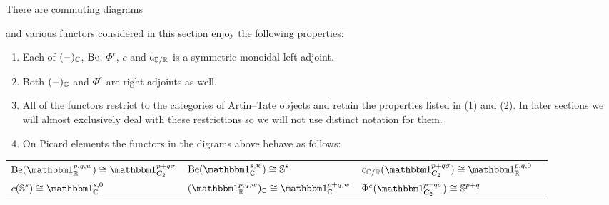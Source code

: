 \begin{summary}\label{prop:comp}
  There are commuting diagrams
  \begin{center}
  \end{center}
  
  and various functors considered in this section enjoy the following properties:
  \begin{enumerate}
  \item Each of $(-)_{\mathbb{C}}$, $\mathrm{Be}$, $\Phi^e$, $c$ and $c_{\mathbb{C}/\mathbb{R}}$ is a symmetric monoidal left adjoint.
  \item Both $(-)_{\mathbb{C}}$ and $\Phi^e$ are right adjoints as well.
  \item All of the functors restrict to the categories of Artin--Tate objects and retain the properties listed in (1) and (2). In later sections we will almost exclusively deal with these restrictions so we will not use distinct notation for them.
  \item On Picard elements the functors in the digrams above behave as follows:
  \end{enumerate}  
  \begin{center}
    \begin{tabular}{llll}
      $ \b(\o_\R^{p,q,w}) \cong \o_{C_2}^{p+q\sigma} $ &
      $ \b(\o_\C^{s,w}) \cong \Ss^s$ &
      $ c_{\C/\R}(\o_{C_2}^{p+q\sigma}) \cong \o_\R^{p,q,0}$ \\
      $ c(\Ss^s) \cong \o_\C^{s,0}$  &
      $ (\o_\R^{p,q,w})_\C \cong \o_\C^{p+q,w}$ &
      $ \Phi^e(\o_{C_2}^{p+q\sigma}) \cong \Ss^{p+q}$ &
    \end{tabular}                  
  \end{center}
\end{summary}


